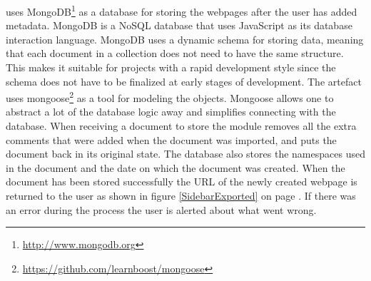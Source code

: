 \theartefact uses MongoDB\footnote{\url{http://www.mongodb.org}} as a database for storing the webpages after the user has added metadata.
MongoDB is a NoSQL database that uses JavaScript as its database interaction language.
MongoDB uses a dynamic schema for storing data,
meaning that each document in a collection does not need to have the same structure.
This makes it suitable for projects with a rapid development style since the schema does not have to be
finalized at early stages of development.
The artefact uses mongoose\footnote{\url{https://github.com/learnboost/mongoose}} as a tool for modeling the objects.
Mongoose allows one to abstract a lot of the database logic away and simplifies connecting with the database.
When receiving a document to store the module removes all the extra comments that were added when the document was
imported, and puts the document back in its original state.
The database also stores the namespaces used in the document and the date on which the document was created.
When the document has been stored successfully the URL of the newly created webpage is returned to the user as shown in
figure \ref{SidebarExported} on page \pageref{SidebarExported}.
If there was an error during the process the user is alerted about what went wrong.
